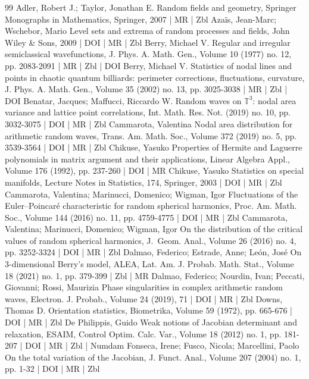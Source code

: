 \documentclass[10pt]{amsart}
\theoremstyle{definition}\newtheorem{defi}[theo]{Definition}\newtheorem{rema}[theo]{Remark}\newtheorem{exam}[theo]{Example}\newtheorem{exem}[theo]{Example}\newtheorem{nota}[theo]{Notation}
\begin{document}
\begin{thebibliography}{99}
 Adler, Robert J.; Taylor, Jonathan E. Random fields and geometry, Springer Monographs in Mathematics, Springer, 2007 | MR | Zbl
 Azaïs, Jean-Marc; Wschebor, Mario Level sets and extrema of random processes and fields, John Wiley \& Sons, 2009 | DOI | MR | Zbl
 Berry, Michael V. Regular and irregular semiclassical wavefunctions, J. Phys. A. Math. Gen., Volume 10 (1977) no. 12, pp. 2083-2091 | MR | Zbl | DOI
 Berry, Michael V. Statistics of nodal lines and points in chaotic quantum billiards: perimeter corrections, fluctuations, curvature, J. Phys. A. Math. Gen., Volume 35 (2002) no. 13, pp. 3025-3038 | MR | Zbl | DOI
 Benatar, Jacques; Maffucci, Riccardo W. Random waves on $\mathbb{T}^3$: nodal area variance and lattice point correlations, Int. Math. Res. Not. (2019) no. 10, pp. 3032-3075 | DOI | MR | Zbl
 Cammarota, Valentina Nodal area distribution for arithmetic random waves, Trans. Am. Math. Soc., Volume 372 (2019) no. 5, pp. 3539-3564 | DOI | MR | Zbl
 Chikuse, Yasuko Properties of Hermite and Laguerre polynomials in matrix argument and their applications, Linear Algebra Appl., Volume 176 (1992), pp. 237-260 | DOI | MR
 Chikuse, Yasuko Statistics on special manifolds, Lecture Notes in Statistics, 174, Springer, 2003 | DOI | MR | Zbl
 Cammarota, Valentina; Marinucci, Domenico; Wigman, Igor Fluctuations of the Euler–Poincaré characteristic for random spherical harmonics, Proc. Am. Math. Soc., Volume 144 (2016) no. 11, pp. 4759-4775 | DOI | MR | Zbl
 Cammarota, Valentina; Marinucci, Domenico; Wigman, Igor On the distribution of the critical values of random spherical harmonics, J. Geom. Anal., Volume 26 (2016) no. 4, pp. 3252-3324 | DOI | MR | Zbl
 Dalmao, Federico; Estrade, Anne; León, José On 3-dimensional Berry’s model, ALEA, Lat. Am. J. Probab. Math. Stat., Volume 18 (2021) no. 1, pp. 379-399 | Zbl | MR
 Dalmao, Federico; Nourdin, Ivan; Peccati, Giovanni; Rossi, Maurizia Phase singularities in complex arithmetic random waves, Electron. J. Probab., Volume 24 (2019), 71 | DOI | MR | Zbl
 Downs, Thomas D. Orientation statistics, Biometrika, Volume 59 (1972), pp. 665-676 | DOI | MR | Zbl
 De Philippis, Guido Weak notions of Jacobian determinant and relaxation, ESAIM, Control Optim. Calc. Var., Volume 18 (2012) no. 1, pp. 181-207 | DOI | MR | Zbl | Numdam
 Fonseca, Irene; Fusco, Nicola; Marcellini, Paolo On the total variation of the Jacobian, J. Funct. Anal., Volume 207 (2004) no. 1, pp. 1-32 | DOI | MR | Zbl

\end{thebibliography}
\end{document}

